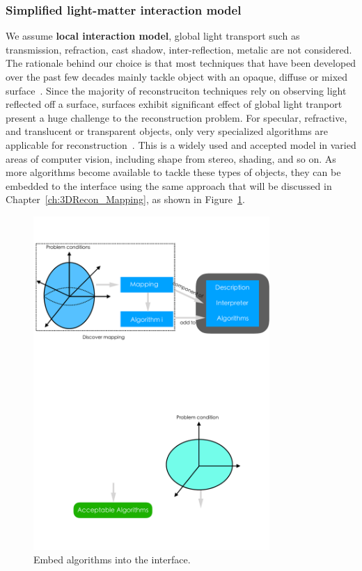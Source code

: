 \subsubsection{Simplified light-matter interaction model}
We assume \textbf{local interaction model}, \ie global light transport such as transmission, refraction, cast shadow, inter-reflection, metalic are not considered. The rationale behind our choice is that most techniques that have been developed over the past few decades mainly tackle object with an opaque, diffuse or mixed surface~\cite{ihrke2010transparent}. Since the majority of reconstruciton techniques rely on observing light reflected off a surface, surfaces exhibit significant effect of global light tranport present a huge challenge to the reconstruction problem. For specular, refractive, and translucent or transparent objects, only very specialized algorithms are applicable for reconstruction~\cite{ihrke2010transparent}. This is a widely used and accepted model in varied areas of computer vision, including shape from stereo, shading, and so on. As more algorithms become available to tackle these types of objects, they can be embedded to the interface using the same approach that will be discussed in Chapter~\ref{ch:3DRecon_Mapping}, as shown in Figure~\ref{fig:embed_algo}.
\begin{figure}[!htbp]
\centering
\includegraphics[width=0.8\textwidth]{img/prob_space/embed_algo.pdf}
\caption{Embed algorithms into the interface.}
\label{fig:embed_algo}
\end{figure}

